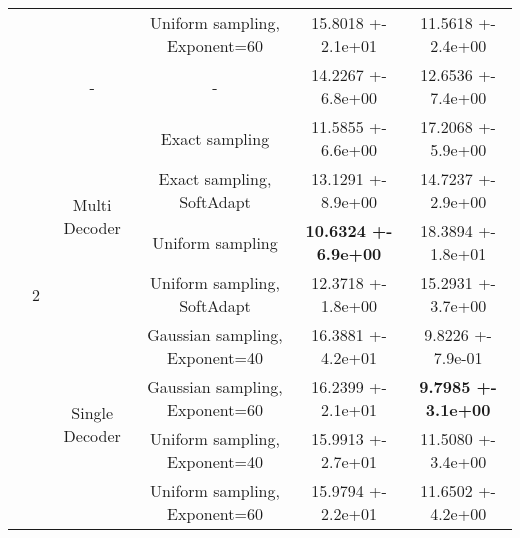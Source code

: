 \begin{tabular}{||c|c|c|c|c|c||}
\cline{4-6}
 &  &  & Uniform sampling, Exponent=60 & 15.8018 +- 2.1e+01 & 11.5618 +- 2.4e+00 \\
\cline{4-6}
\cline{3-6}
\cline{2-6}
 & \multirow{9}{*}{2} & \multirow{1}{*}{-} & - & 14.2267 +- 6.8e+00 & 12.6536 +- 7.4e+00 \\
\cline{4-6}
\cline{3-6}
 &  & \multirow{4}{*}{Multi Decoder} & Exact sampling & 11.5855 +- 6.6e+00 & 17.2068 +- 5.9e+00 \\
\cline{4-6}
 &  &  & Exact sampling, SoftAdapt & 13.1291 +- 8.9e+00 & 14.7237 +- 2.9e+00 \\
\cline{4-6}
 &  &  & Uniform sampling & \textbf{10.6324 +- 6.9e+00} & 18.3894 +- 1.8e+01 \\
\cline{4-6}
 &  &  & Uniform sampling, SoftAdapt & 12.3718 +- 1.8e+00 & 15.2931 +- 3.7e+00 \\
\cline{4-6}
\cline{3-6}
 &  & \multirow{4}{*}{Single Decoder} & Gaussian sampling, Exponent=40 & 16.3881 +- 4.2e+01 & 9.8226 +- 7.9e-01 \\
\cline{4-6}
 &  &  & Gaussian sampling, Exponent=60 & 16.2399 +- 2.1e+01 & \textbf{9.7985 +- 3.1e+00} \\
\cline{4-6}
 &  &  & Uniform sampling, Exponent=40 & 15.9913 +- 2.7e+01 & 11.5080 +- 3.4e+00 \\
\cline{4-6}
 &  &  & Uniform sampling, Exponent=60 & 15.9794 +- 2.2e+01 & 11.6502 +- 4.2e+00 \\
\cline{4-6}
\cline{3-6}
\cline{2-6}
\hline
\hline
\end{tabular}

